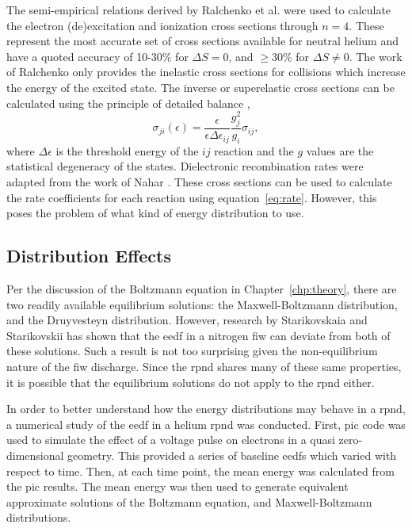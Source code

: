 The semi-empirical relations derived by Ralchenko et al. \cite{Ralchenko2008}
were used to calculate the electron (de)excitation and ionization cross sections
through $n=4$. These represent the most accurate set of cross sections available
for neutral helium and have a quoted accuracy of 10-30\% for $\Delta S=0$, and
$\ge30$\% for $\Delta S \neq 0$. The work of Ralchenko only provides the
inelastic cross sections for collisions which increase the energy of the excited
state. The inverse or superelastic cross sections can be calculated using the
principle of detailed balance \cite{Kunze2009},
\begin{equation}
  \sigma_{ji}(\epsilon) = \frac{\epsilon}{\epsilon\Delta\epsilon_{ij}}
    \frac{g_j^2}{g_i}\sigma_{ij},
\end{equation}
where $\Delta\epsilon$ is the threshold energy of the $ij$ reaction and the $g$
values are the statistical degeneracy of the states. Dielectronic recombination
rates were adapted from the work of Nahar \cite{Nahar2010}. These cross sections
can be used to calculate the rate coefficients for each reaction using
equation~\ref{eq:rate}. However, this poses the problem of what kind of energy
distribution to use.

\subsection{Distribution Effects}

Per the discussion of the Boltzmann equation in Chapter~\ref{chp:theory}, there
are two readily available equilibrium solutions: the Maxwell-Boltzmann
distribution, and the Druyvesteyn distribution. However, research by
Starikovskaia and Starikovskii \cite{Starikovskaia2001} has shown that the
\acs{eedf} in a nitrogen \acs{fiw} can deviate from both of these solutions.
Such a result is not too surprising given the non-equilibrium nature of the
\acs{fiw} discharge. Since the \acs{rpnd} shares many of these same properties,
it is possible that the equilibrium solutions do not apply to the \acs{rpnd}
either.

In order to better understand how the energy distributions may behave in a
\acs{rpnd}, a numerical study of the \acs{eedf} in a helium \acs{rpnd} was
conducted. First, \acs{pic} code was used to simulate the effect of a voltage
pulse on electrons in a quasi zero-dimensional geometry. This provided a series
of baseline \acs{eedf}s which varied with respect to time. Then, at each time
point, the mean energy was calculated from the \acs{pic} results. The mean
energy was then used to generate equivalent approximate solutions of the
Boltzmann equation, and Maxwell-Boltzmann distributions.

